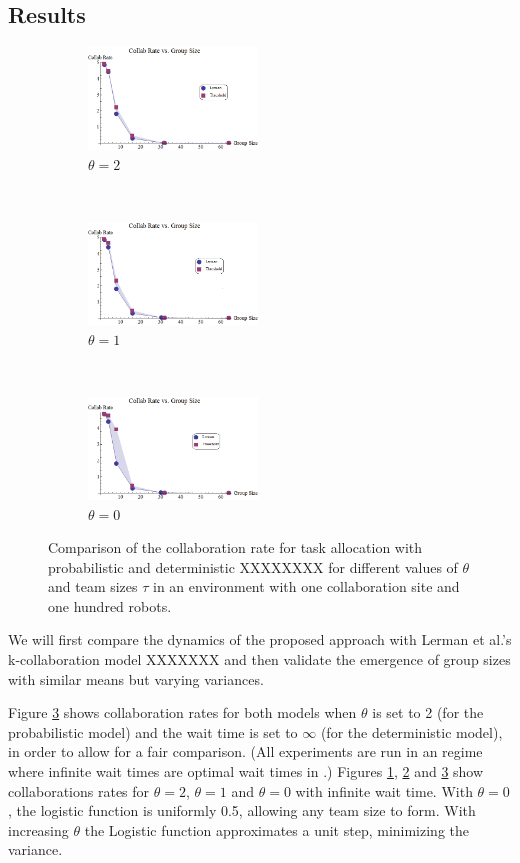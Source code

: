 \documentclass[Main.tex]{subfiles}
\begin{document}
\subsection*{Results}
\begin{figure}[!htb]
\begin{subfigure}{0.33\textwidth}
\centering\includegraphics[width=4.5cm]{assets/LermanCollabCompare3.png}
\centering\caption{$\theta=2$}\label{fig:lercol3}
\end{subfigure}~
\begin{subfigure}{0.33\textwidth}
\centering\includegraphics[width=4.5cm]{assets/LermanCollabCompare2.png}
\centering\caption{$\theta=1$}\label{fig:lercol2}
\end{subfigure}~
\begin{subfigure}{0.33\textwidth}
\centering\includegraphics[width=4.5cm]{assets/LermanCollabCompare1.png}
\centering\caption{$\theta=0$}\label{fig:lercol1}
\end{subfigure}
\caption{Comparison of the collaboration rate for task allocation with probabilistic and deterministic XXXXXXXX
for different values of $\theta$ and team sizes $\tau$ in an environment with one collaboration site and one hundred robots. }\label{fig:lercol}
\end{figure}

We will first compare the dynamics of the proposed approach with Lerman et al.'s k-collaboration model XXXXXXX
and then validate the emergence of group sizes with similar means but varying variances.

Figure \ref{fig:lercol1} shows collaboration rates for both models when $\theta$ is set to 2 (for the probabilistic model) and the wait time is set to $\infty$ (for the deterministic model), in order to allow for a fair comparison. (All experiments are run in an regime where infinite wait times are optimal wait times in \cite{Lerman2001}.) Figures \ref{fig:lercol3}, \ref{fig:lercol2} and \ref{fig:lercol1} show collaborations rates for $\theta = 2$, $\theta = 1$ and $\theta=0$ with infinite wait time. With $\theta=0$, the logistic function is uniformly 0.5, allowing any team size to form.  
With increasing $\theta$ the Logistic function approximates a unit step, minimizing the variance. 
\end{document}
